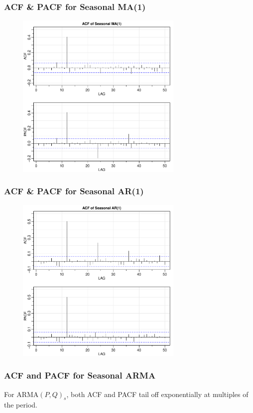 \documentclass[%
xcolor=pdftex]{beamer}
\begin{document}
\begin{frame}
\frametitle{ACF \& PACF for Seasonal MA(1)}

\includegraphics[width=100mm, height=80mm]{s_ma1.pdf}

\end{frame}

\begin{frame}
\frametitle{ACF \& PACF for Seasonal AR(1)}

\includegraphics[width=100mm, height=80mm]{s_ar1.pdf}

\end{frame}

\begin{frame}
\frametitle{ACF and PACF for Seasonal ARMA}

 For ARMA$(P,Q)_s$, both ACF and PACF tail off exponentially at multiples of the period.

\end{frame}
\end{document}
